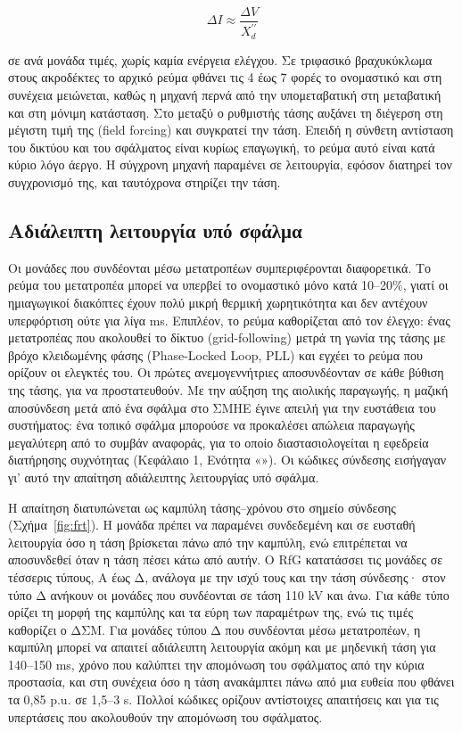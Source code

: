 \begin{equation}
\Delta I \approx \frac{\Delta V}{X_d^{\prime\prime}}
\label{eq:sm-dI}
\end{equation}

σε ανά μονάδα τιμές, χωρίς καμία ενέργεια ελέγχου. Σε τριφασικό βραχυκύκλωμα στους ακροδέκτες
το αρχικό ρεύμα φθάνει τις 4 έως 7 φορές το ονομαστικό και στη συνέχεια μειώνεται, καθώς η
μηχανή περνά από την υπομεταβατική στη μεταβατική και στη μόνιμη κατάσταση. Στο μεταξύ ο
ρυθμιστής τάσης αυξάνει τη διέγερση στη μέγιστη τιμή της (field forcing) και συγκρατεί την
τάση. Επειδή η σύνθετη αντίσταση του δικτύου και του σφάλματος είναι κυρίως επαγωγική, το ρεύμα
αυτό είναι κατά κύριο λόγο άεργο. Η σύγχρονη μηχανή παραμένει σε λειτουργία, εφόσον διατηρεί
τον συγχρονισμό της, και ταυτόχρονα στηρίζει την τάση.

\subsection{Αδιάλειπτη λειτουργία υπό σφάλμα}
\label{sec:frt-req}

Οι μονάδες που συνδέονται μέσω μετατροπέων συμπεριφέρονται διαφορετικά. Το ρεύμα του
μετατροπέα μπορεί να υπερβεί το ονομαστικό μόνο κατά 10--20\%, γιατί οι ημιαγωγικοί διακόπτες
έχουν πολύ μικρή θερμική χωρητικότητα και δεν αντέχουν υπερφόρτιση ούτε για λίγα ms. Επιπλέον,
το ρεύμα καθορίζεται από τον έλεγχο: ένας μετατροπέας που ακολουθεί το δίκτυο (grid-following)
μετρά τη γωνία της τάσης με βρόχο κλειδωμένης φάσης (Phase-Locked Loop, PLL) και εγχέει το
ρεύμα που ορίζουν οι ελεγκτές του. Οι πρώτες ανεμογεννήτριες αποσυνδέονταν σε κάθε βύθιση της
τάσης, για να προστατευθούν. Με την αύξηση της αιολικής παραγωγής, η μαζική αποσύνδεση μετά από
ένα σφάλμα στο ΣΜΗΕ έγινε απειλή για την ευστάθεια του συστήματος: ένα τοπικό
σφάλμα μπορούσε να προκαλέσει απώλεια παραγωγής μεγαλύτερη από το συμβάν αναφοράς, για το οποίο
διαστασιολογείται η εφεδρεία διατήρησης συχνότητας (Κεφάλαιο 1, Ενότητα «»).
Οι κώδικες σύνδεσης εισήγαγαν γι' αυτό την απαίτηση αδιάλειπτης λειτουργίας υπό σφάλμα.

Η απαίτηση διατυπώνεται ως καμπύλη τάσης--χρόνου στο σημείο σύνδεσης (Σχήμα~\ref{fig:frt}).
Η μονάδα πρέπει να παραμένει συνδεδεμένη και σε ευσταθή λειτουργία όσο η τάση βρίσκεται πάνω
από την καμπύλη, ενώ επιτρέπεται να αποσυνδεθεί όταν η τάση πέσει κάτω από αυτήν. Ο RfG
κατατάσσει τις μονάδες σε τέσσερις τύπους, Α έως Δ, ανάλογα με την ισχύ τους και την τάση
σύνδεσης· στον τύπο Δ ανήκουν οι μονάδες που συνδέονται σε τάση 110 kV και άνω. Για κάθε τύπο
ορίζει τη μορφή της καμπύλης και τα εύρη των παραμέτρων της, ενώ τις τιμές καθορίζει ο ΔΣΜ. Για
μονάδες τύπου Δ που συνδέονται μέσω μετατροπέων, η καμπύλη μπορεί να απαιτεί αδιάλειπτη
λειτουργία ακόμη και με μηδενική τάση για 140--150 ms, χρόνο που καλύπτει την απομόνωση του
σφάλματος από την κύρια προστασία, και στη συνέχεια όσο η τάση ανακάμπτει πάνω από μια ευθεία
που φθάνει τα 0,85 p.u. σε 1,5--3 s. Πολλοί κώδικες ορίζουν αντίστοιχες απαιτήσεις και για τις
υπερτάσεις που ακολουθούν την απομόνωση του σφάλματος.

